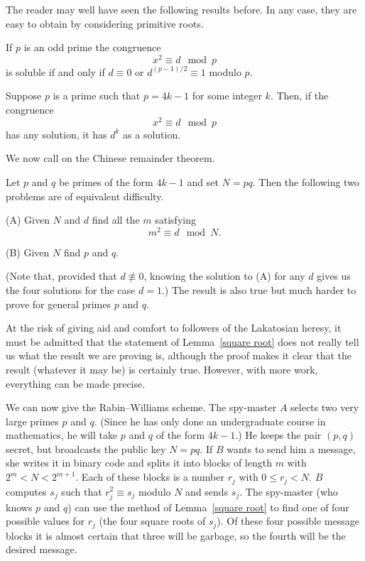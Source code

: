 The reader may well have seen the following results 
before.
In any case, they are
easy to obtain by considering primitive
roots.
\begin{lemma} If $p$ is an odd prime the congruence
\[x^{2}\equiv d\mod{p}\]
is soluble if and only if $d\equiv 0$ or
$d^{(p-1)/2}\equiv 1$ modulo $p$.
\end{lemma}
\begin{lemma} Suppose $p$ is a prime such that
$p=4k-1$ for some integer $k$. Then, if the congruence
\[x^{2}\equiv d\mod{p}\]
has any solution, it has $d^{k}$ as a solution.
\end{lemma}
We now call on the Chinese remainder theorem.
\begin{lemma}\label{square root}
Let $p$ and $q$ be primes of the
form $4k-1$ and set $N=pq$.
Then the following two problems are of equivalent
difficulty.

(A) Given $N$ and $d$ find all the $m$ satisfying
\[m^{2}\equiv d\mod{N}.\]

(B) Given $N$ find $p$ and $q$.
\end{lemma}
\noindent
(Note that, provided that $d\not\equiv 0$,
knowing the solution to (A) for any $d$
gives us the four solutions for the case $d=1$.)
The result is also true but much harder
to prove for general primes $p$ and $q$.



At the risk of giving aid and comfort
to followers of the
Lakatosian heresy, it must be admitted  that
the statement of Lemma~\ref{square root}
does not really tell us what the result
we are proving is,
although the proof makes it  clear
that the result (whatever it may be) is certainly
true. However, with more work, everything can be
made precise.

We can now give the Rabin--Williams scheme.
The spy-master $A$ selects two very large
primes $p$ and $q$. (Since he has only done
an undergraduate course in mathematics,
he will take $p$ and $q$ of the form $4k-1$.)
He keeps the pair $(p,q)$ secret, but broadcasts
the public key $N=pq$. If $B$ wants to
send him a message, she writes it in binary code and
splits it into blocks of length $m$ with
$2^{m}<N<2^{m+1}$. Each of these blocks
is a number $r_{j}$ with $0\leq r_{j}<N$.
$B$ computes $s_{j}$ such that $r_{j}^{2}\equiv s_{j}$
modulo $N$ and sends $s_{j}$. The spy-master
(who knows $p$ and $q$) can use the
method of Lemma~\ref{square root} to find
one of four possible values for $r_{j}$
(the four square roots of $s_{j}$).
Of these four possible message blocks
it is almost
certain that three will be garbage, so
the fourth will be the desired message.

